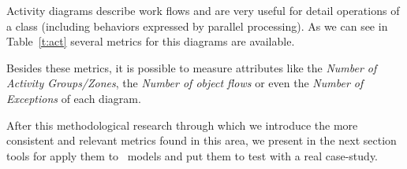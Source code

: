 Activity diagrams describe work flows and are very useful for detail operations of a class (including behaviors expressed by parallel processing).
As we can see in Table~\ref{t:act} several metrics for this diagrams are available.

Besides these metrics, it is possible to measure attributes like the \emph{Number of Activity Groups/Zones}, the \emph{Number of object flows} or even the \emph{Number of Exceptions} of each diagram.

After this methodological research through which we introduce the more consistent and relevant metrics found in this area, we present in the next section tools for apply them to \uml\ models and put them to test with a real case-study.

